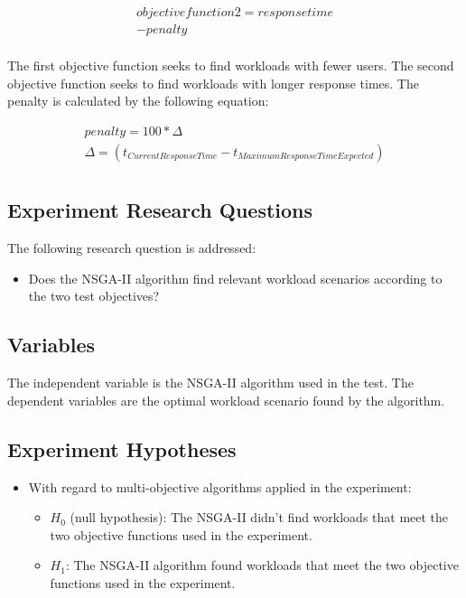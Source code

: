 \documentclass[espaco=umemeio,chapter=TITLE,twoside,openright]{abnt}
\begin{document}
\begin{equation}
\begin{aligned}
objective function 2 =responsetime\\
-penalty\\
\end{aligned}
\end{equation}

The first objective function seeks to find workloads with fewer users. The second objective function seeks to find workloads with longer response times. The penalty is calculated by the following equation:

\begin{equation}
\begin{aligned}
penalty=100 * \Delta \\
\Delta=(t_{Current Response Time} - t_{Maximum Response Time Expected})\\
\end{aligned}
\end{equation}



\subsection{Experiment Research Questions}

The following research question is addressed:
\begin{itemize}
\item Does the NSGA-II algorithm find relevant workload scenarios according to the two test objectives?
\end{itemize}

\subsection{Variables}

The independent variable is the NSGA-II algorithm used in the test. The dependent variables are the optimal workload scenario found by the algorithm.

\subsection{Experiment Hypotheses}

\begin{itemize}
\item With regard to multi-objective algorithms applied in the experiment:
\begin{itemize}
\item $H_{0}$ (null hypothesis): The NSGA-II didn't find workloads that meet the two objective functions used in the experiment.
\item $H_{1}$: The NSGA-II  algorithm found workloads that meet the two objective functions used in the experiment.
\end{itemize}
\end{itemize}
\end{document}
